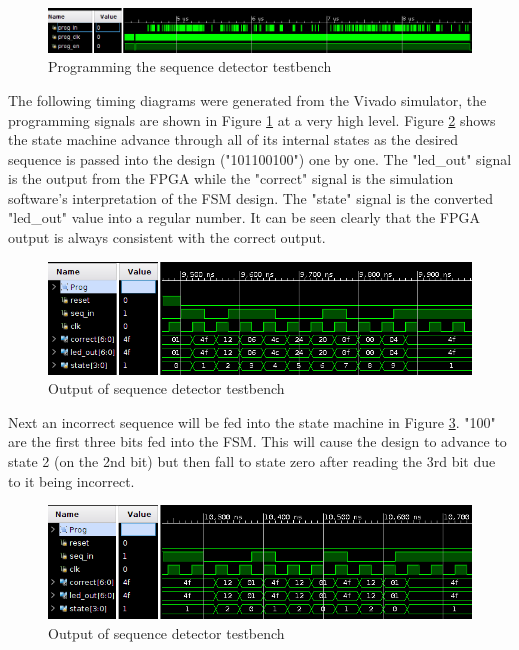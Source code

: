 \documentclass[12pt]{article}
\begin{document}
\begin{figure}[H]
    \centering
    \includegraphics[width=1\textwidth]{prog_signals}
    \caption{Programming the sequence detector testbench}
    \label{fig:prog}
\end{figure}

The following timing diagrams were generated from the Vivado simulator, the programming
signals are shown in Figure \ref{fig:prog} at a very high level. Figure \ref{fig:zero_to_9}
 shows the state machine advance through all of
its internal states as the desired sequence is passed into the design ("101100100")
one by one. The "led\_out" signal is the output from the FPGA while the "correct" signal
is the simulation software's interpretation of the FSM design. The "state" signal is
the converted "led\_out" value into a regular number. It can be seen clearly that
the FPGA output is always consistent with the correct output.

\begin{figure}[H]
    \centering
    \includegraphics[width=1\textwidth]{zero_to_9}
    \caption{Output of sequence detector testbench}
    \label{fig:zero_to_9}
\end{figure}

Next an incorrect sequence will be fed into the state machine in Figure \ref{fig:break_early}.
"100" are the first
three bits fed into the FSM. This will cause the design to advance to state 2 (on the
2nd bit) but then fall to state zero after reading the 3rd bit due to it being incorrect.

\begin{figure}[H]
    \centering
    \includegraphics[width=1\textwidth]{break_early}
    \caption{Output of sequence detector testbench}
    \label{fig:break_early}
\end{figure}
\end{document}

